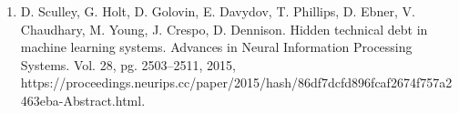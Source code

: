 \documentclass[12pt]{article}
\begin{document}
\begin{enumerate}
\item D. Sculley, G. Holt, D. Golovin, E. Davydov, T. Phillips, D. Ebner,
  V. Chaudhary, M. Young, J. Crespo, D. Dennison. Hidden technical debt
  in machine learning systems. Advances in Neural Information Processing
  Systems. Vol. 28, pg. 2503--2511, 2015,
  https://proceedings.neurips.cc/paper/2015/hash/86df7dcfd896fcaf2674f757a2463eba-Abstract.html.

\end{enumerate}
\end{document}
